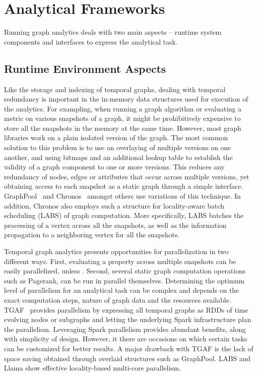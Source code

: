 \documentclass{svjour3}
\begin{document}
\section{Analytical Frameworks}

Running graph analytics deals with two main aspects -- runtime system components and interfaces to express the analytical task.

\subsection{Runtime Environment Aspects}

 Like the storage and indexing of temporal graphs, dealing with temporal redundancy is important in the in-memory data structures used for execution of the analytics. For exampling, when running a graph algorithm or evaluating a metric on various snapshots of a graph, it might be prohibitively expensive to store all the snapshots in the memory at the same time. However, most graph libraries work on a plain isolated version of the graph. The most common solution to this problem is to use an overlaying of multiple versions on one another, and using bitmaps and an additional lookup table to establish the validity of a graph component to one or more versions. This reduces any redundancy of nodes, edges or attributes that occur across multiple versions, yet obtaining access to each snapshot as a static graph through a simple interface. GraphPool~\cite{khurana2013efficient} and Chronos~\cite{han2014chronos} amongst others use variations of this technique. In addition, Chronos also employs such a structure for locality-aware batch scheduling (LABS) of graph computation. More specifically, LABS batches the processing of a vertex across all the snapshots, as well as the information propagation to a neighboring vertex for all the snapshots.

\vspace{2mm}

 Temporal graph analytics presents opportunities for parallelization in two different ways. First, evaluating a property across multiple snapshots can be easily parallelized, unless . Second, several static graph computation operations such as Pagerank, can be run in parallel themselves. Determining the optimum level of parallelism for an analytical task can be complex and depends on the exact computation steps, nature of graph data and the resources available. TGAF~\cite{khurana2016storing} provides parallelism by expressing all temporal graphs as RDDs of time evolving nodes or subgraphs and letting the underlying Spark infrastructure plan the parallelism. Leveraging Spark parallelism provides abundant benefits, along with simplicity of design. However, it there are occasions on which certain tasks can be customized for better results. A major drawback with TGAF is the lack of space saving obtained through overlaid structures such as GraphPool. LABS and Llama show effective locality-based multi-core parallelism.%
\end{document}

